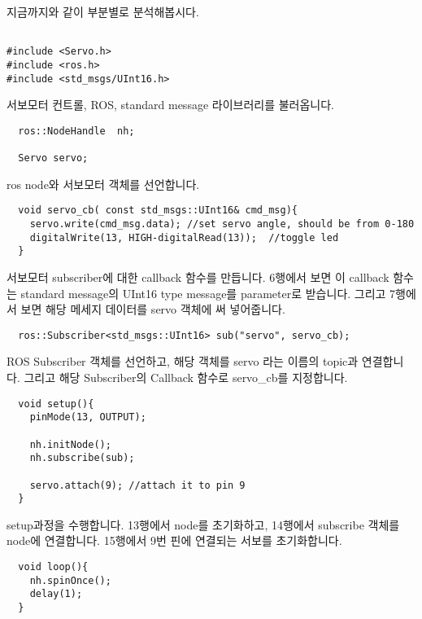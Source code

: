 \documentclass[11pt,fleqn]{book} %
\begin{document}
지금까지와 같이 부분별로 분석해봅시다.

\begin{verbatim}

#include <Servo.h>
#include <ros.h>
#include <std_msgs/UInt16.h>

\end{verbatim}

서보모터 컨트롤, ROS, standard message 라이브러리를 불러옵니다.

\begin{verbatim}
  ros::NodeHandle  nh;

  Servo servo;
\end{verbatim}

ros node와 서보모터 객체를 선언합니다.

\begin{verbatim}
  void servo_cb( const std_msgs::UInt16& cmd_msg){
    servo.write(cmd_msg.data); //set servo angle, should be from 0-180
    digitalWrite(13, HIGH-digitalRead(13));  //toggle led
  }
\end{verbatim}

서보모터 subscriber에 대한 callback 함수를 만듭니다.
6행에서 보면 이 callback 함수는 standard message의 UInt16 type message를 parameter로 받습니다.
그리고 7행에서 보면 해당 메세지 데이터를 servo 객체에 써 넣어줍니다.

\begin{verbatim}
  ros::Subscriber<std_msgs::UInt16> sub("servo", servo_cb);
\end{verbatim}

ROS Subscriber 객체를 선언하고, 해당 객체를 servo 라는 이름의 topic과 연결합니다. 그리고 해당 Subscriber의 Callback 함수로 servo\_cb를 지정합니다.

\begin{verbatim}
  void setup(){
    pinMode(13, OUTPUT);

    nh.initNode();
    nh.subscribe(sub);

    servo.attach(9); //attach it to pin 9
  }
\end{verbatim}

setup과정을 수행합니다. 13행에서 node를 초기화하고, 14행에서 subscribe 객체를 node에 연결합니다.
15행에서 9번 핀에 연결되는 서보를 초기화합니다.

\begin{verbatim}
  void loop(){
    nh.spinOnce();
    delay(1);
  }
\end{verbatim}
\end{document}
